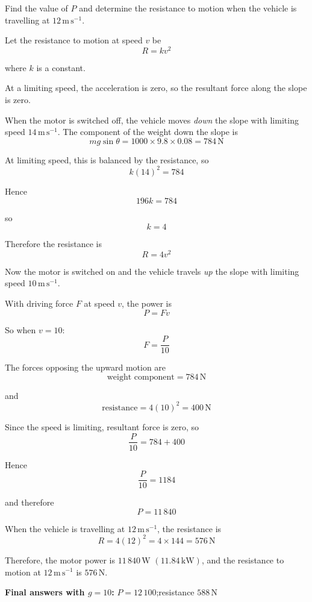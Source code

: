 \documentclass[leqno]{article}
\begin{document}
\begin{enumerate}[
  label=\textbf{\arabic*.},
  leftmargin=*,
  topsep=0pt,
  partopsep=0pt,
  parsep=0pt
]
Find the value of $P$ and determine the resistance to motion when the vehicle is travelling at $12\,\mathrm{m\,s^{-1}}$.  \\

\vspace*{10pt}

\begin{djsSolution}
Let the resistance to motion at speed \(v\) be
\[
R=kv^2
\]

where \(k\) is a constant.

At a limiting speed, the acceleration is zero, so the resultant force along the slope is zero.

When the motor is switched off, the vehicle moves \emph{down} the slope with limiting speed \(14\,\mathrm{m\,s^{-1}}\). The component of the weight down the slope is
\[
mg\sin\theta = 1000\times 9.8\times 0.08 = 784\,\mathrm{N}
\]

At limiting speed, this is balanced by the resistance, so
\[
k(14)^2=784
\]

Hence
\[
196k=784
\]

so
\[
k=4
\]

Therefore the resistance is
\[
R=4v^2
\]

Now the motor is switched on and the vehicle travels \emph{up} the slope with limiting speed \(10\,\mathrm{m\,s^{-1}}\).

With driving force \(F\) at speed \(v\), the power is
\[
P=Fv
\]

So when \(v=10\):
\[
F=\frac{P}{10}
\]

The forces opposing the upward motion are
\[
\text{weight component} = 784\,\mathrm{N}
\]

and
\[
\text{resistance} = 4(10)^2=400\,\mathrm{N}
\]

Since the speed is limiting, resultant force is zero, so
\[
\frac{P}{10}=784+400
\]

Hence
\[
\frac{P}{10}=1184
\]

and therefore
\[
P=11\,840
\]

When the vehicle is travelling at \(12\,\mathrm{m\,s^{-1}}\), the resistance is
\[
R=4(12)^2=4\times 144=576\,\mathrm{N}
\]

Therefore, the motor power is \(11\,840\,\mathrm{W}\) \((11.84\,\mathrm{kW})\), and the resistance to motion at \(12\,\mathrm{m\,s^{-1}}\) is \(576\,\mathrm{N}\).
\par\medskip\noindent\textbf{Final answers with \(g = 10\):} \(P = 12\,100\);\quad resistance \(588\,\mathrm{N}\)
\end{djsSolution}



\end{enumerate}
\end{document}
